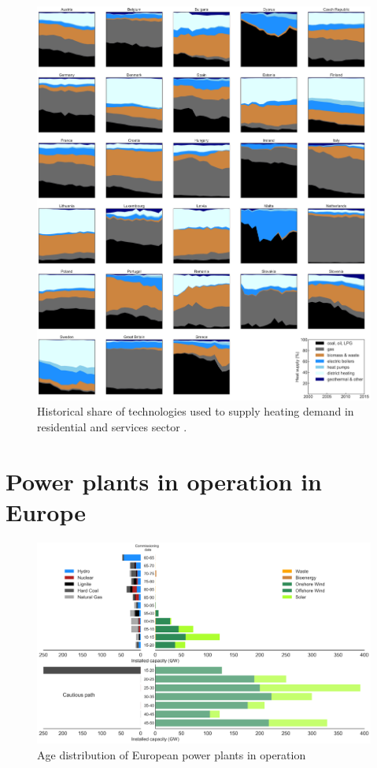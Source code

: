 \documentclass[3p]{elsarticle} %
\begin{document}
\begin{figure}[!h]
\centering
\includegraphics[width=\textwidth]{figures/heating_historical.png}
\caption{Historical share of technologies used to supply heating demand in residential and services sector \cite{IDEES}. } \label{fig_historical_heating} 
\end{figure}

\section{Power plants in operation in Europe}

\begin{figure}[!h]
\centering
\includegraphics[width=\textwidth]{figures/age_distribution.png}
\caption{Age distribution of European power plants in operation \cite{powerplantmatching, IRENA_2019}} \label{fig_age_distribution} 
\end{figure}
\end{document}
